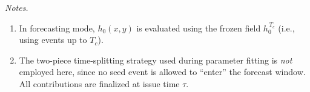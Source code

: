 \documentclass[linenum,doublespace,onecolumn]{SSA-SRL}
\theoremstyle{lemma}
\begin{document}
\medskip
\noindent\emph{Notes.}
\begin{enumerate}
    \item[(i)] In forecasting mode, $h_0(x, y)$ is evaluated using the frozen field $h_0^{\,T_c}$ (i.e., using events up to $T_c$).
    \item[(ii)] The two-piece time-splitting strategy used during parameter fitting is \emph{not} employed here, since no seed event is allowed to “enter” the forecast window. All contributions are finalized at issue time $\tau$.
\end{enumerate}


\end{document}
